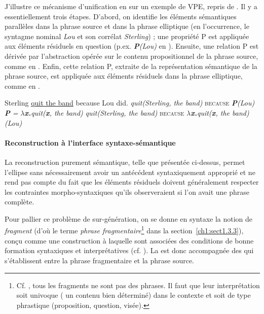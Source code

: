 J’illustre ce mécanisme d’unification en  sur un exemple de VPE, repris de \citet{Kennedy2003}. Il y a essentiellement trois étapes. D’abord, on identifie les éléments sémantiques parallèles dans la phrase source et dans la phrase elliptique (en l’occurrence, le syntagme nominal \textit{Lou} et son corrélat \textit{Sterling}) ; une propriété P est appliquée aux éléments résiduels en question (p.ex. \textbf{\textit{P}}\textit{(Lou)} en ). Ensuite, une relation P est dérivée par l’abstraction opérée sur le contenu propositionnel de la phrase source, comme en . Enfin, cette relation P, extraite de la représentation sémantique de la phrase source, est appliquée aux éléments résiduels dans la phrase elliptique, comme en .

\ea
Sterling \uline{quit the band} because Lou did. \label{ch1:ex141}             
\ea  \textit{quit(Sterling, the band)} \textsc{because} \textbf{\textit{P}}\textit{(Lou)} \label{ch1:ex141a} 
\ex  \textbf{\textit{P}}\textit{ =} \textbf{\textit{$\lambda $x.}}\textit{quit(}\textbf{\textit{x}}\textit{, the band)} \label{ch1:ex141b}
\ex  \textit{quit(Sterling, the band)} \textsc{because} \textbf{\textit{$\lambda $x.}}\textit{quit(}\textbf{\textit{x}}\textit{, the band)(Lou)} \label{ch1:ex141c}
\z
\z


\paragraph{Reconstruction à l’interface syntaxe-sémantique}

La reconstruction purement sémantique, telle que présentée ci-dessus, permet l’ellipse sans nécessairement avoir un antécédent syntaxiquement approprié et ne rend pas compte du fait que les éléments résiduels doivent généralement respecter les contraintes morpho-syntaxiques qu’ils observeraient si l’on avait une phrase complète. 

Pour pallier ce problème de sur-génération, on se donne en syntaxe la notion de \textit{fragment} (d’où le terme \textit{phrase fragmentaire}\footnote{Cf. \citet{AbeilleToAppear}, tous les fragments ne sont pas des phrases. Il faut que leur interprétation soit univoque ({\cad} un contenu bien déterminé) dans le contexte et soit de type phrastique (proposition, question, visée).} dans la section~\ref{ch1:sect1.3.3}), conçu comme une construction à laquelle sont associées des conditions de bonne formation syntaxiques et interprétatives (cf. \citealt{GinzburgEtAl2000,CulicoverEtAl2005}). La  est donc accompagnée des  qui s’établissent entre la phrase fragmentaire et la phrase source. 

